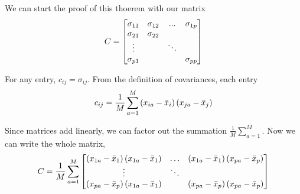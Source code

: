 \documentclass[12pt]{report}
\begin{document}
            \begin{myproof}
                We can start the proof of this thoerem with our matrix
                \[
                    C = \begin{bmatrix}
                        \sigma_{11} & \sigma_{12} & ...    & \sigma_{1p} \\
                        \sigma_{21} & \sigma_{22} &        &             \\
                        \vdots      &             & \ddots &             \\
                        \sigma_{p1} &             &        & \sigma _{pp}
                    \end{bmatrix}
                \]

                For any entry, $c_{ij}=\sigma_{ij}$. From the definition of covariances, each entry 
                    \[
                        c_{ij} = \frac{1}{M} \sum_{a=1}^M \left(x_{ia} - \bar{x}_i\right) \left(x_{ja} - \bar{x}_j\right)
                    \]
                
                Since matrices add linearly, we can factor out the summation $\frac{1}{M} \sum_{a=1}^M$. Now we can write the whole matrix,
                    \[
                        C = \frac{1}{M} \sum_{a=1}^M \begin{bmatrix}
                            \left(x_{1a} - \bar{x}_1\right) \left(x_{1a} - \bar{x}_1\right) & \dotsc  & \left(x_{1a} - \bar{x}_1\right) \left(x_{pa} - \bar{x}_p\right) \\
                            \vdots & \ddots & \\
                            \left(x_{pa} - \bar{x}_p\right) \left(x_{1a} - \bar{x}_1\right) &  & \left(x_{pa} - \bar{x}_p\right) \left(x_{pa} - \bar{x}_p\right)
                        \end{bmatrix}
                    \] 
                

\end{myproof}
\end{document}
